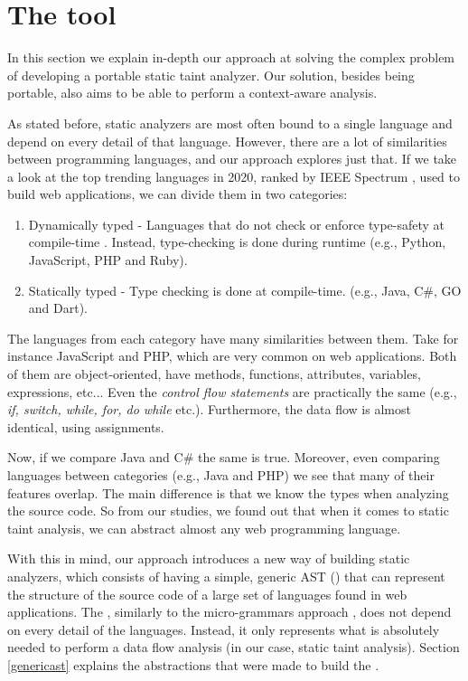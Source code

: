 \section{The \toolname{} tool}
\label{solution}
In this section we explain in-depth our approach at solving the complex problem of developing a portable static taint analyzer. Our solution, besides being portable, also aims to be able to perform a context-aware analysis.

As stated before, static analyzers are most often bound to a single language and depend on every detail of that language. However, there are a lot of similarities between programming languages, and our approach explores just that. If we take a look at the top trending languages in 2020, ranked by IEEE Spectrum \cite{cass2020top}, used to build web applications, we can divide them in two categories:

\begin{enumerate}
    \item Dynamically typed - Languages that do not check or enforce type-safety at compile-time \cite{tratt2009dynamically}. Instead, type-checking is done during runtime (e.g., Python, JavaScript, PHP and Ruby).
    \item Statically typed - Type checking is done at compile-time. (e.g., Java, C\#, GO and Dart).
\end{enumerate}


The languages from each category have many similarities between them. Take for instance JavaScript and PHP, which are very common on web applications. Both of them are object-oriented, have methods, functions, attributes, variables, expressions, etc... Even the \textit{control flow statements} are practically the same (e.g., \textit{if, switch, while, for, do while} etc.). Furthermore, the data flow is almost identical, using assignments. 

Now, if we compare Java and C\# the same is true. Moreover, even comparing languages between categories (e.g., Java and PHP) we see that many of their features overlap. The main difference is that we know the types when analyzing the source code. So from our studies, we found out that when it comes to static taint analysis, we can abstract almost any web programming language. 

With this in mind, our approach introduces a new way of building static analyzers, which consists of having a simple, generic AST (\astname{}) that can represent the structure of the source code of a large set of languages found in web applications. The \astname{}, similarly to the micro-grammars approach \cite{microgrammars}, does not depend on every detail of the languages. Instead, it only represents what is absolutely needed to perform a data flow analysis (in our case, static taint analysis). Section \ref{genericast} explains the abstractions that were made to build the \astname{}.

